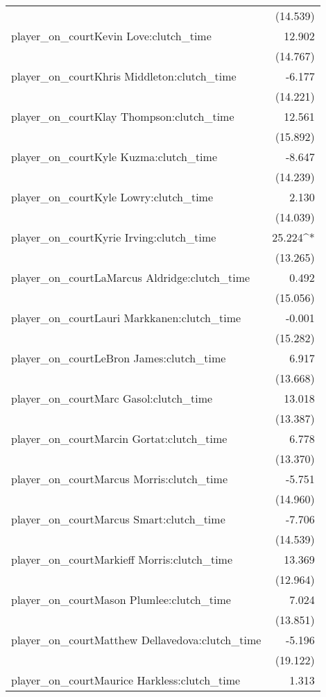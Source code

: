 \documentclass[
  landscape]{article}
\begin{document}
\begin{table}[!htbp]
\begin{tabular}{@{\extracolsep{5pt}}lD{.}{.}{-3} }
  & (14.539) \\ 
  player\_on\_courtKevin Love:clutch\_time & 12.902 \\ 
  & (14.767) \\ 
  player\_on\_courtKhris Middleton:clutch\_time & -6.177 \\ 
  & (14.221) \\ 
  player\_on\_courtKlay Thompson:clutch\_time & 12.561 \\ 
  & (15.892) \\ 
  player\_on\_courtKyle Kuzma:clutch\_time & -8.647 \\ 
  & (14.239) \\ 
  player\_on\_courtKyle Lowry:clutch\_time & 2.130 \\ 
  & (14.039) \\ 
  player\_on\_courtKyrie Irving:clutch\_time & 25.224^{*} \\ 
  & (13.265) \\ 
  player\_on\_courtLaMarcus Aldridge:clutch\_time & 0.492 \\ 
  & (15.056) \\ 
  player\_on\_courtLauri Markkanen:clutch\_time & -0.001 \\ 
  & (15.282) \\ 
  player\_on\_courtLeBron James:clutch\_time & 6.917 \\ 
  & (13.668) \\ 
  player\_on\_courtMarc Gasol:clutch\_time & 13.018 \\ 
  & (13.387) \\ 
  player\_on\_courtMarcin Gortat:clutch\_time & 6.778 \\ 
  & (13.370) \\ 
  player\_on\_courtMarcus Morris:clutch\_time & -5.751 \\ 
  & (14.960) \\ 
  player\_on\_courtMarcus Smart:clutch\_time & -7.706 \\ 
  & (14.539) \\ 
  player\_on\_courtMarkieff Morris:clutch\_time & 13.369 \\ 
  & (12.964) \\ 
  player\_on\_courtMason Plumlee:clutch\_time & 7.024 \\ 
  & (13.851) \\ 
  player\_on\_courtMatthew Dellavedova:clutch\_time & -5.196 \\ 
  & (19.122) \\ 
  player\_on\_courtMaurice Harkless:clutch\_time & 1.313 \\ 

\end{tabular}
\end{table}
\end{document}
